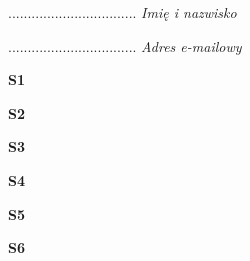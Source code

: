 .................................
\textit{Imię i nazwisko}

.................................
\textit{Adres e-mailowy}

\Large \textbf{S1}

\Large \textbf{S2}

\Large \textbf{S3}

\Large \textbf{S4}

\Large \textbf{S5}

\Large \textbf{S6}
